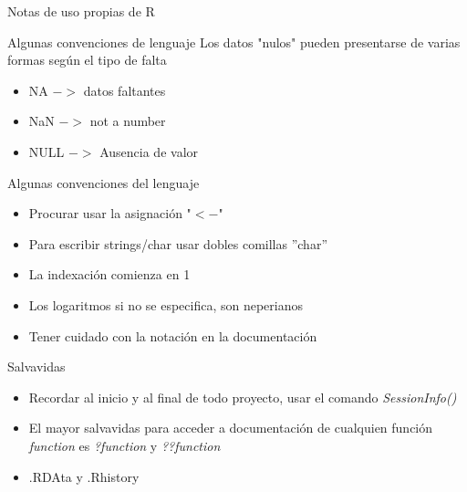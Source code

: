 \documentclass[aspectratio=169,xcolor=dvipsnames]{beamer}
\begin{document}
\begin{section}{Notas de uso propias de R}
\begin{frame}{Algunas convenciones de lenguaje}
    Los datos "nulos" pueden presentarse de varias formas según el tipo de falta
    \begin{itemize}
        \item NA   $->$ datos faltantes
        \item NaN  $->$ not a number
        \item NULL $->$ Ausencia de valor
    \end{itemize}
\end{frame}

\begin{frame}{Algunas convenciones del lenguaje}
    \begin{itemize}
        \item Procurar usar la asignación "$<-$"
        \item Para escribir strings/char usar dobles comillas ''char''
        \item La indexación comienza en 1
        \item Los logaritmos si no se especifica, son neperianos
        \item Tener cuidado con la notación en la documentación
    \end{itemize}  
\end{frame}

\begin{frame}{Salvavidas}
    \begin{itemize}
        \item Recordar al inicio y al final de todo proyecto, usar el comando \textit{SessionInfo()}
        \item El mayor salvavidas para acceder a documentación de cualquien función \textit{function} es \textit{?function} y \textit{??function}
        \item .RDAta y .Rhistory 
    \end{itemize}

\end{frame}

\end{section}
\end{document}
